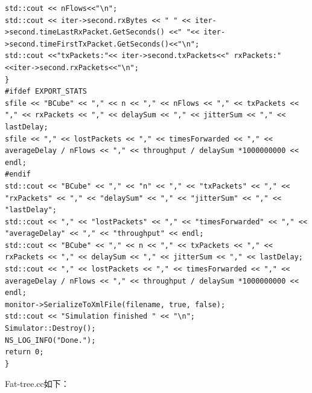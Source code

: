 \documentclass[lang=cn,11pt,a4paper,cite=authoryear]{elegantpaper}
\begin{document}
\begin{lstlisting}
std::cout << nFlows<<"\n";
std::cout << iter->second.rxBytes << " " << iter->second.timeLastRxPacket.GetSeconds() <<" "<< iter->second.timeFirstTxPacket.GetSeconds()<<"\n";
std::cout <<"txPackets:"<< iter->second.txPackets<<" rxPackets:"<<iter->second.rxPackets<<"\n";
}
#ifdef EXPORT_STATS
sfile << "BCube" << "," << n << "," << nFlows << "," << txPackets << "," << rxPackets << "," << delaySum << "," << jitterSum << "," << lastDelay;
sfile << "," << lostPackets << "," << timesForwarded << "," << averageDelay / nFlows << "," << throughput / delaySum *1000000000 << endl;
#endif
std::cout << "BCube" << "," << "n" << "," << "txPackets" << "," << "rxPackets" << "," << "delaySum" << "," << "jitterSum" << "," << "lastDelay";
std::cout << "," << "lostPackets" << "," << "timesForwarded" << "," << "averageDelay" << "," << "throughput" << endl;
std::cout << "BCube" << "," << n << "," << txPackets << "," << rxPackets << "," << delaySum << "," << jitterSum << "," << lastDelay;
std::cout << "," << lostPackets << "," << timesForwarded << "," << averageDelay / nFlows << "," << throughput / delaySum *1000000000 << endl;
monitor->SerializeToXmlFile(filename, true, false);
std::cout << "Simulation finished " << "\n";
Simulator::Destroy();
NS_LOG_INFO("Done.");
return 0;
}
\end{lstlisting}


Fat-tree.cc如下：
\end{document}
